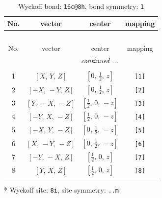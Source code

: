 \documentclass[fleqn,8pt]{jsarticle}
\begin{document}
\renewcommand{\arraystretch}{1.2}
\begin{longtable}{cccc}
\caption{Wyckoff bond: {\tt 16c@8h}, bond symmetry: {\tt 1}}
 \\
 \hline \hline
No. & vector & center & mapping \\ \hline \endfirsthead

\multicolumn{3}{l}{\tablename\ \thetable{}} \\
 \hline \hline
No. & vector & center & mapping \\ \hline \endhead

 \hline \hline
\multicolumn{3}{r}{\footnotesize\it continued ...} \\ \endfoot

 \hline \hline
\multicolumn{3}{r}{} \\ \endlastfoot

1 & $\left[ X,\, Y,\, Z \right]$ & $\left[ 0,\, \frac{1}{2},\, z \right]$ & {\tt [1]} \\ \hline
2 & $\left[ - X,\, - Y,\, Z \right]$ & $\left[ 0,\, \frac{1}{2},\, z \right]$ & {\tt [2]} \\ \hline
3 & $\left[ Y,\, - X,\, - Z \right]$ & $\left[ \frac{1}{2},\, 0,\, - z \right]$ & {\tt [3]} \\ \hline
4 & $\left[ - Y,\, X,\, - Z \right]$ & $\left[ \frac{1}{2},\, 0,\, - z \right]$ & {\tt [4]} \\ \hline
5 & $\left[ - X,\, Y,\, - Z \right]$ & $\left[ 0,\, \frac{1}{2},\, - z \right]$ & {\tt [5]} \\ \hline
6 & $\left[ X,\, - Y,\, - Z \right]$ & $\left[ 0,\, \frac{1}{2},\, - z \right]$ & {\tt [6]} \\ \hline
7 & $\left[ - Y,\, - X,\, Z \right]$ & $\left[ \frac{1}{2},\, 0,\, z \right]$ & {\tt [7]} \\ \hline
8 & $\left[ Y,\, X,\, Z \right]$ & $\left[ \frac{1}{2},\, 0,\, z \right]$ & {\tt [8]} \\
\end{longtable}
* Wyckoff site: {\tt 8i}, site symmetry: {\tt ..m}
\renewcommand{\arraystretch}{1.2}
\end{document}
